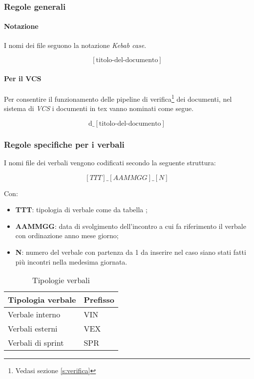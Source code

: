 \subsubsection{Regole generali}
\paragraph{Notazione}I nomi dei file seguono la notazione \textit{Kebab case}.

\[[\text{titolo-del-documento}]\]

\paragraph{Per il VCS} Per consentire il funzionamento delle pipeline di verifica\footnote{Vedasi sezione \ref{s:verifica}} dei documenti, nel sistema di \textit{VCS} i documenti in tex vanno nominati come segue.

\[\text{d}\_[\text{titolo-del-documento}]\]

\subsubsection{Regole specifiche per i verbali}
I nomi file dei verbali vengono codificati secondo la seguente struttura:

\[[TTT]\_[AAMMGG]\_[N]\]

Con:
\begin{itemize}
    \item \textbf{TTT}: tipologia di verbale come da tabella  ;
    \item \textbf{AAMMGG}: data di svolgimento dell'incontro a cui fa riferimento il verbale con ordinazione anno mese giorno;
    \item \textbf{N}: numero del verbale con partenza da 1 da inserire nel caso siano stati fatti più incontri nella medesima giornata.
\end{itemize}

\begin{table}[h]
    \centering
    \begin{tabularx}{0.7\linewidth}{X | l}
        \textbf{Tipologia verbale} & \textbf{Prefisso}\\
        \hline
        Verbale interno & VIN \\
        Verbali esterni & VEX\\
        Verbali di sprint & SPR \\
    \end{tabularx}
    \caption{Tipologie verbali}
    \label{table:t_verbali}
\end{table}



